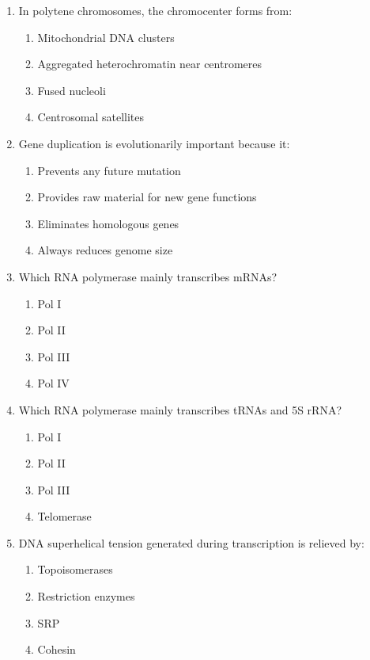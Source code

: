 \documentclass[12pt,fontset=none]{ctexart}
\begin{document}
\begin{enumerate}
\item In polytene chromosomes, the chromocenter forms from:
\begin{enumerate}[label=\alph*.]
\item Mitochondrial DNA clusters
\item Aggregated heterochromatin near centromeres
\item Fused nucleoli
\item Centrosomal satellites
\end{enumerate}

\item Gene duplication is evolutionarily important because it:
\begin{enumerate}[label=\alph*.]
\item Prevents any future mutation
\item Provides raw material for new gene functions
\item Eliminates homologous genes
\item Always reduces genome size
\end{enumerate}

\item Which RNA polymerase mainly transcribes mRNAs?
\begin{enumerate}[label=\alph*.]
\item Pol I
\item Pol II
\item Pol III
\item Pol IV
\end{enumerate}

\item Which RNA polymerase mainly transcribes tRNAs and 5S rRNA?
\begin{enumerate}[label=\alph*.]
\item Pol I
\item Pol II
\item Pol III
\item Telomerase
\end{enumerate}

\item DNA superhelical tension generated during transcription is relieved by:
\begin{enumerate}[label=\alph*.]
\item Topoisomerases
\item Restriction enzymes
\item SRP
\item Cohesin
\end{enumerate}


\end{enumerate}
\end{document}

